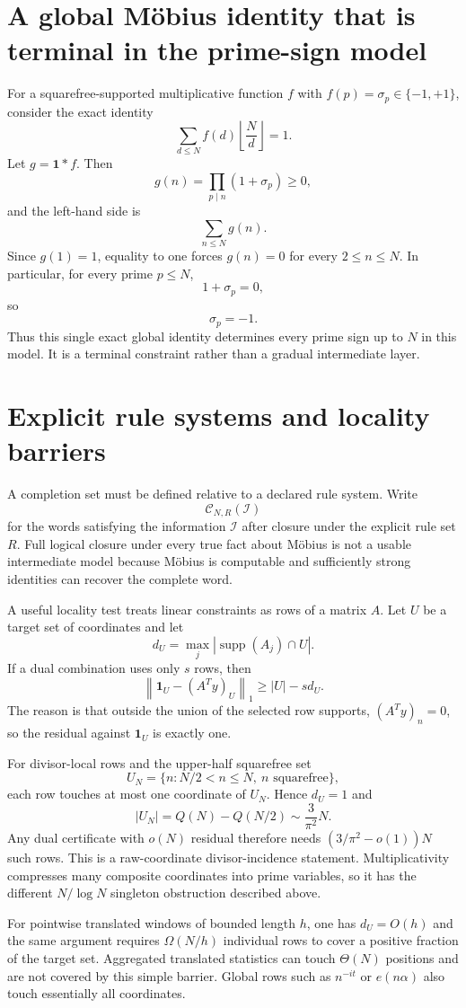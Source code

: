 \documentclass[11pt]{article}
\begin{document}
\section{A global Möbius identity that is terminal in the prime-sign model}
For a squarefree-supported multiplicative function $f$ with $f(p)=\sigma_p\in\{-1,+1\}$, consider the exact identity
\[
 \sum_{d\le N}f(d)\left\lfloor\frac Nd\right\rfloor=1.
\]
Let $g=\mathbf1*f$. Then
\[
 g(n)=\prod_{p\mid n}(1+\sigma_p)\ge0,
\]
and the left-hand side is
\[
 \sum_{n\le N}g(n).
\]
Since $g(1)=1$, equality to one forces $g(n)=0$ for every $2\le n\le N$. In particular, for every prime $p\le N$,
\[
 1+\sigma_p=0,
\]
so
\[
 \sigma_p=-1.
\]
Thus this single exact global identity determines every prime sign up to $N$ in this model. It is a terminal constraint rather than a gradual intermediate layer.

\section{Explicit rule systems and locality barriers}
A completion set must be defined relative to a declared rule system. Write
\[
 \mathcal C_{N,R}(\mathcal I)
\]
for the words satisfying the information $\mathcal I$ after closure under the explicit rule set $R$. Full logical closure under every true fact about Möbius is not a usable intermediate model because Möbius is computable and sufficiently strong identities can recover the complete word.

A useful locality test treats linear constraints as rows of a matrix $A$. Let $U$ be a target set of coordinates and let
\[
 d_U=\max_j|\operatorname{supp}(A_j)\cap U|.
\]
If a dual combination uses only $s$ rows, then
\[
 \left\|\mathbf 1_U-(A^Ty)_U\right\|_1
 \ge |U|-s d_U.
\]
The reason is that outside the union of the selected row supports, $(A^Ty)_n=0$, so the residual against $\mathbf1_U$ is exactly one.

For divisor-local rows and the upper-half squarefree set
\[
 U_N=\{n:N/2<n\le N,\ n\text{ squarefree}\},
\]
each row touches at most one coordinate of $U_N$. Hence $d_U=1$ and
\[
 |U_N|=Q(N)-Q(N/2)\sim\frac{3}{\pi^2}N.
\]
Any dual certificate with $o(N)$ residual therefore needs $(3/\pi^2-o(1))N$ such rows. This is a raw-coordinate divisor-incidence statement. Multiplicativity compresses many composite coordinates into prime variables, so it has the different $N/\log N$ singleton obstruction described above.

For pointwise translated windows of bounded length $h$, one has $d_U=O(h)$ and the same argument requires $\Omega(N/h)$ individual rows to cover a positive fraction of the target set. Aggregated translated statistics can touch $\Theta(N)$ positions and are not covered by this simple barrier. Global rows such as $n^{-it}$ or $e(n\alpha)$ also touch essentially all coordinates.
\end{document}
